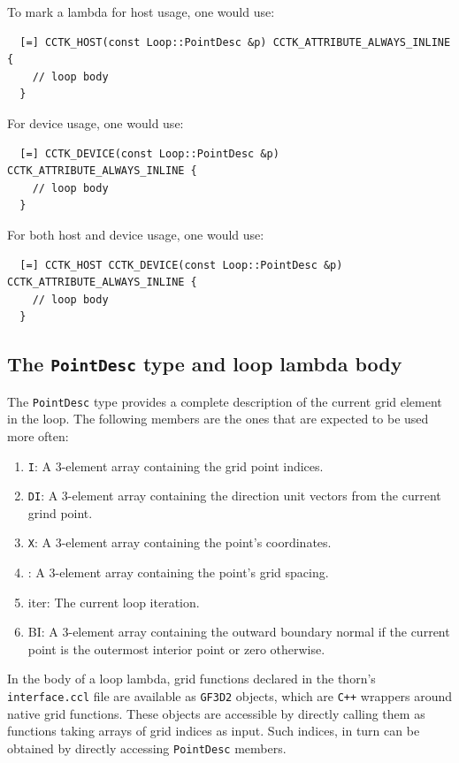 To mark a lambda for host usage, one would use:
%
\begin{lstlisting}
  [=] CCTK_HOST(const Loop::PointDesc &p) CCTK_ATTRIBUTE_ALWAYS_INLINE {
    // loop body
  }
\end{lstlisting}
%
For device usage, one would use:
%
\begin{lstlisting}
  [=] CCTK_DEVICE(const Loop::PointDesc &p) CCTK_ATTRIBUTE_ALWAYS_INLINE {
    // loop body
  }
\end{lstlisting}
%
For both host and device usage, one would use:
%
\begin{lstlisting}
  [=] CCTK_HOST CCTK_DEVICE(const Loop::PointDesc &p) CCTK_ATTRIBUTE_ALWAYS_INLINE {
    // loop body
  }
\end{lstlisting}

\subsection{The \texttt{PointDesc} type and loop lambda body}
\label{sec:point_des}

The \texttt{PointDesc} type provides a complete description of the current grid element in the loop. The following members are the ones that are expected to be used more often:
%
\begin{enumerate}
  \item \texttt{I}: A 3-element array containing the grid point indices.
  \item \texttt{DI}: A 3-element array containing the direction unit vectors from the current grind point.
  \item \texttt{X}: A 3-element array containing the point's coordinates.
  \item {}: A 3-element array containing the point's grid spacing.
  \item {iter}: The current loop iteration.
  \item {BI}: A 3-element array containing the outward boundary normal if the current point is the outermost interior point or zero otherwise.
\end{enumerate}

In the body of a loop lambda, grid functions declared in the thorn's \texttt{interface.ccl} file are available as \texttt{GF3D2} objects, which are \texttt{C++} wrappers around native \Cactus\space grid functions. These objects are accessible by directly calling them as functions taking arrays of grid indices as input. Such indices, in turn can be obtained by directly accessing \texttt{PointDesc} members.

